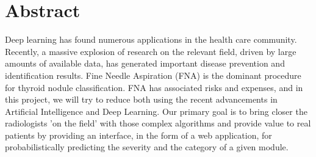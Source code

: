 \chapter{Abstract}
\label{abstract}

Deep learning has found numerous applications in the health care community. Recently, a massive explosion of research on the relevant field, 
driven by large amounts of available data, has generated important disease prevention and identification results. Fine Needle Aspiration (FNA) 
is the dominant procedure for thyroid nodule classification. FNA has associated risks and expenses, and in this project,
we will try to reduce both using the recent advancements in Artificial Intelligence and Deep Learning. Our primary goal is to 
bring closer the radiologists 'on the field' with those complex algorithms and provide value to real patients by providing an interface, 
in the form of a web application, for probabilistically predicting the severity and the category of a given module.
